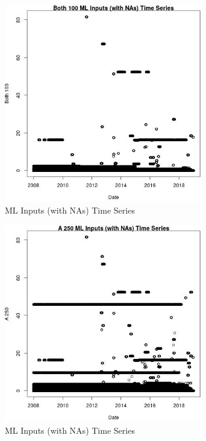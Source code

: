\begin{figure} 
\centering  
\includegraphics[width=0.77\textwidth]{Code_Outputs/Report_ML_input_PM25_Step4_part_e_de_duplicated_aveswNAs_Both_100vDate.jpg} 
\caption{\label{fig:Report_ML_input_PM25_Step4_part_e_de_duplicated_aveswNAsBoth_100vDate}ML Inputs (with NAs) Time Series} 
\end{figure} 
 

\begin{figure} 
\centering  
\includegraphics[width=0.77\textwidth]{Code_Outputs/Report_ML_input_PM25_Step4_part_e_de_duplicated_aveswNAs_A_250vDate.jpg} 
\caption{\label{fig:Report_ML_input_PM25_Step4_part_e_de_duplicated_aveswNAsA_250vDate}ML Inputs (with NAs) Time Series} 
\end{figure} 
 

